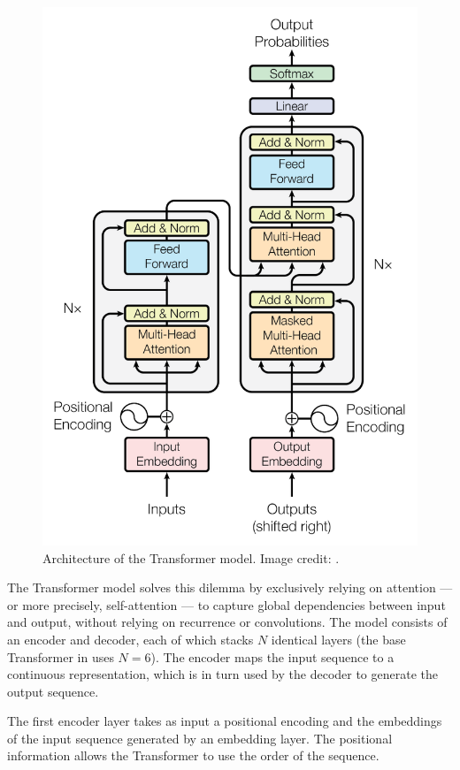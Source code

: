 \documentclass[11pt,a4paper]{article}
\begin{document}
\begin{figure}[ht]
    \centering
    \includegraphics[scale=0.45]{images/Transformer.PNG}
    \caption{Architecture of the Transformer model. Image credit: \cite{transformer}.}
    \label{fig:transformer}
\end{figure}

The Transformer model solves this dilemma by exclusively relying on attention --- or more precisely, self-attention --- to capture global dependencies between input and output, without relying on recurrence or convolutions.
The model consists of an encoder and decoder, each of which stacks $N$ identical layers  (the base Transformer in \citet{transformer} uses $N=6$). The encoder maps the input sequence to a continuous representation, which is in turn used by the decoder to generate the output sequence.

The first encoder layer takes as input a positional encoding and the embeddings of the input sequence generated by an embedding layer. The positional information allows the Transformer to use the order of the sequence.
\end{document}
